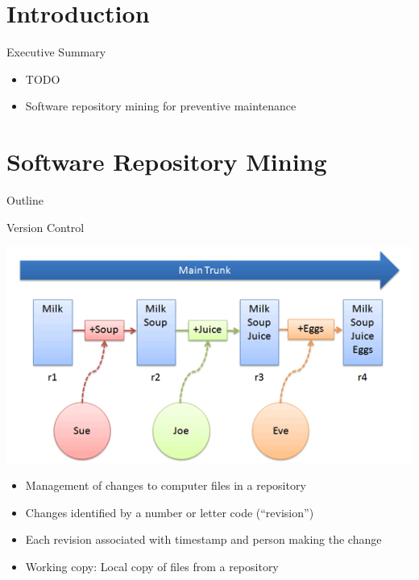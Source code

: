 \section*{Introduction}

\begin{frame}{Executive Summary}
  \begin{itemize}
  \item TODO
  \item Software repository mining for preventive maintenance
  \end{itemize}
\end{frame}



\section{Software Repository Mining}


\begin{frame}{Outline}
  \tableofcontents[current]
\end{frame}


\begin{frame}{Version Control}
  \begin{center}
    \includegraphics[scale=0.35]{figures/vcs}
  \end{center}


  \begin{itemize}
  \item Management of changes to computer files in a repository
  \item Changes identified by a number or letter code (``revision'')
  \item Each revision associated with timestamp and person
    making the change
  \item Working copy: Local copy of files from a repository
  \end{itemize}
\end{frame}

